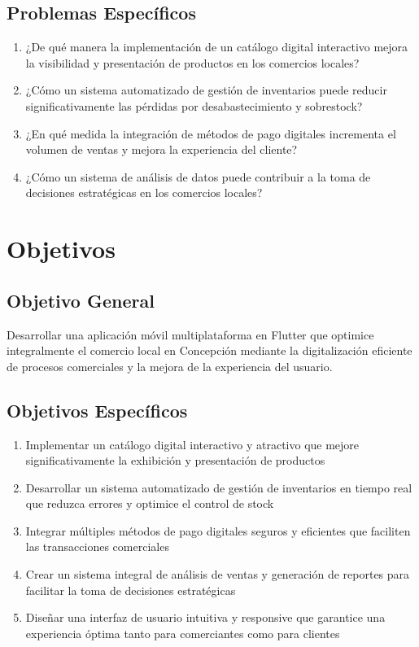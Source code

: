 \documentclass[12pt,a4paper]{report}
\begin{document}
\subsection{Problemas Específicos}
\begin{enumerate}
	\item ¿De qué manera la implementación de un catálogo digital interactivo mejora la visibilidad y presentación de productos en los comercios locales?
	\item ¿Cómo un sistema automatizado de gestión de inventarios puede reducir significativamente las pérdidas por desabastecimiento y sobrestock?
	\item ¿En qué medida la integración de métodos de pago digitales incrementa el volumen de ventas y mejora la experiencia del cliente?
	\item ¿Cómo un sistema de análisis de datos puede contribuir a la toma de decisiones estratégicas en los comercios locales?
\end{enumerate}

\section{Objetivos}

\subsection{Objetivo General}
Desarrollar una aplicación móvil multiplataforma en Flutter que optimice integralmente el comercio local en Concepción mediante la digitalización eficiente de procesos comerciales y la mejora de la experiencia del usuario.

\subsection{Objetivos Específicos}
\begin{enumerate}
	\item Implementar un catálogo digital interactivo y atractivo que mejore significativamente la exhibición y presentación de productos
	\item Desarrollar un sistema automatizado de gestión de inventarios en tiempo real que reduzca errores y optimice el control de stock
	\item Integrar múltiples métodos de pago digitales seguros y eficientes que faciliten las transacciones comerciales
	\item Crear un sistema integral de análisis de ventas y generación de reportes para facilitar la toma de decisiones estratégicas
	\item Diseñar una interfaz de usuario intuitiva y responsive que garantice una experiencia óptima tanto para comerciantes como para clientes
\end{enumerate}
\end{document}
